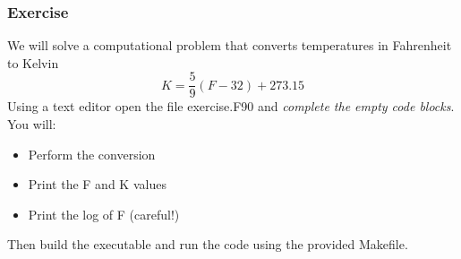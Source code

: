 \documentclass[11pt]{beamer}
\begin{document}

\begin{frame}[fragile]
\frametitle{Exercise}

We will solve a computational problem that converts temperatures in Fahrenheit to Kelvin\\
\begin{equation}
K = \frac{5}{9}(F - 32) + 273.15
\end{equation}
Using a text editor open the file exercise.F90 and \emph{complete the empty code blocks}. You will:
\begin{itemize}
\item Perform the conversion
\item Print the F and K values
\item Print the log of F (careful!)
 \end{itemize}
Then build the executable and run the code using the provided Makefile.

\end{frame}
\end{document}
